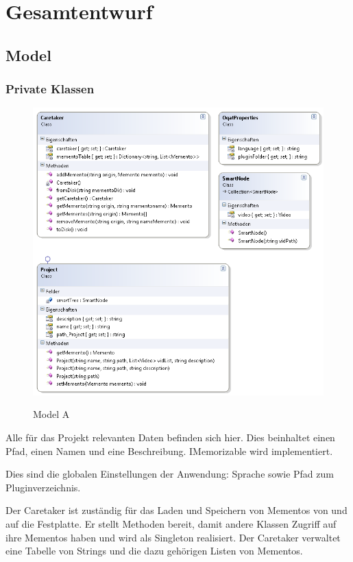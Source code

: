\chapter{Gesamtentwurf}

\section{Model}

\subsection{Private Klassen}
\begin{figure}[H]
\noindent\includegraphics[scale=1]{bilder/Klassendiagramm/Model.png}
\label{Private Model A}
\caption{Model A}
\end{figure}

Alle für das Projekt relevanten Daten befinden sich hier. Dies beinhaltet einen Pfad, einen Namen und eine Beschreibung. IMemorizable wird implementiert.


Dies sind die globalen Einstellungen der Anwendung: Sprache sowie Pfad zum Pluginverzeichnis.


Der Caretaker ist zuständig für das Laden und Speichern von Mementos von und auf die Festplatte.
Er stellt Methoden bereit, damit andere Klassen Zugriff auf ihre Mementos haben und wird als Singleton realisiert. Der Caretaker verwaltet eine Tabelle von Strings und die dazu gehörigen Listen von Mementos. 


